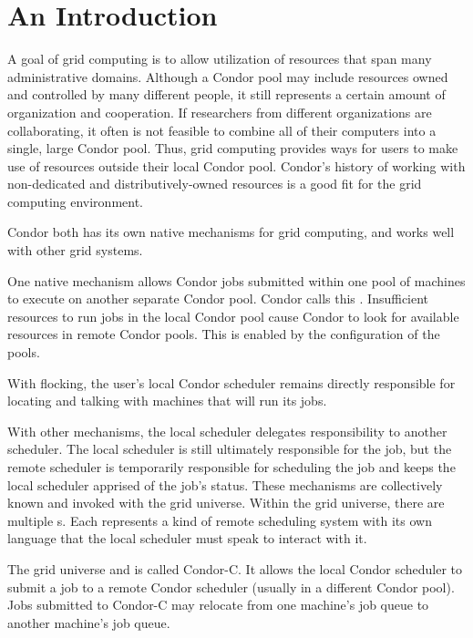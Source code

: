 \section{\label{sec:grids-intro}An Introduction}

A goal of grid computing is to allow utilization of resources that
span many administrative domains.
Although a Condor pool may include
resources owned and controlled by many different people,
it still
represents a certain amount of organization and cooperation.
If researchers from different organizations are collaborating,
it often is not feasible to combine all of their computers
into a single, large Condor pool.
Thus, grid computing provides ways for users to make use of
resources outside their local Condor pool.
Condor's history of working with non-dedicated and
distributively-owned resources
is a good fit for the grid computing environment.

Condor both has its own native mechanisms for grid computing,
and works well with other grid systems.

One native mechanism allows Condor jobs submitted within one pool
of machines to execute on another separate Condor pool.
Condor calls this .
Insufficient resources to run jobs in the local Condor pool
cause
Condor to look for available resources in remote Condor pools.
This is enabled by the configuration of the pools.

With flocking, the user's local Condor scheduler remains directly
responsible for locating and talking with machines that will run its
jobs. 

With other mechanisms, the local scheduler delegates
responsibility to another scheduler.
The local scheduler is still
ultimately responsible for the job, but the remote scheduler is 
temporarily responsible for scheduling the job and keeps the local
scheduler apprised of the job's status.
These mechanisms are
collectively known and invoked with
the grid universe.
Within the grid universe, there
are multiple s. Each 
represents a kind of remote
scheduling system with its own language that the local scheduler must
speak to interact with it.

The grid universe and  
is called Condor-C.
It allows the local Condor scheduler to submit a job to
a remote Condor scheduler (usually in a different Condor pool).
Jobs submitted to Condor-C may relocate from one machine's
job queue to another machine's job queue.

